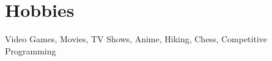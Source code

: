 \documentclass[letterpaper,12pt]{article}
\makeatletter
\newcommand{\resumeOrganizationHeading}[4]{
  \vspace{-2pt}\item
    \begin{tabular*}{0.97\textwidth}[t]{l@{\extracolsep{\fill}}r}
      \textbf{#1} & \textit{\small #2} \\
      \textit{\small#3}
    \end{tabular*}\vspace{-7pt}
}
\newcommand{\resumeSubHeadingListStart}{\begin{itemize}[leftmargin=0.15in, label={}]}
\newcommand{\resumeSubHeadingListEnd}{\end{itemize}}
\makeatother
\begin{document}







\section{Hobbies}
\resumeSubHeadingListStart
\small{\item{Video Games, Movies, TV Shows, Anime, Hiking, Chess, Competitive Programming }}
\resumeSubHeadingListEnd







\end{document}
